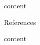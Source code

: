 \documentclass{beamer}
\title[]{} %
\author[]{} %
\institute[NCSU]{North Carolina State University}
\date[\today]{\today} %
\begin{document}
	
	\begin{frame}
		content
	\end{frame}
	
	\appendix
	\begin{frame}[allowframebreaks]{References}
		\printbibliography
	\end{frame}
	
	\begin{frame}
		content
	\end{frame}
	
\end{document}
